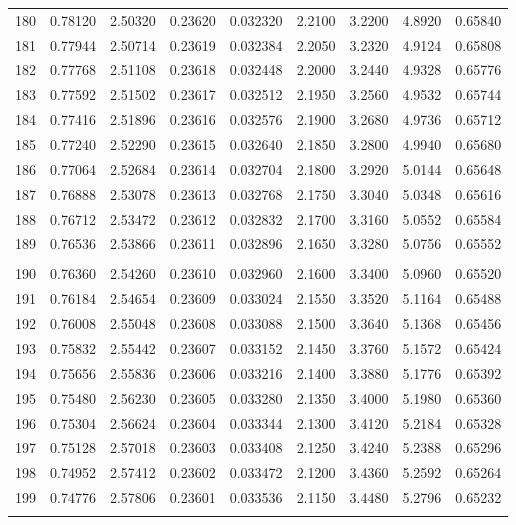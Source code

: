 \documentclass[letter,twosides,10pt]{article}
\begin{document}
\begin{longtable}{|c|c|c|c|c|c|c|c|c|}
180 & 0.78120 & 2.50320 & 0.23620 & 0.032320 & 2.2100 & 3.2200 & 4.8920 & 0.65840 \\
181 & 0.77944 & 2.50714 & 0.23619 & 0.032384 & 2.2050 & 3.2320 & 4.9124 & 0.65808 \\
182 & 0.77768 & 2.51108 & 0.23618 & 0.032448 & 2.2000 & 3.2440 & 4.9328 & 0.65776 \\
183 & 0.77592 & 2.51502 & 0.23617 & 0.032512 & 2.1950 & 3.2560 & 4.9532 & 0.65744 \\
184 & 0.77416 & 2.51896 & 0.23616 & 0.032576 & 2.1900 & 3.2680 & 4.9736 & 0.65712 \\
185 & 0.77240 & 2.52290 & 0.23615 & 0.032640 & 2.1850 & 3.2800 & 4.9940 & 0.65680 \\
186 & 0.77064 & 2.52684 & 0.23614 & 0.032704 & 2.1800 & 3.2920 & 5.0144 & 0.65648 \\
187 & 0.76888 & 2.53078 & 0.23613 & 0.032768 & 2.1750 & 3.3040 & 5.0348 & 0.65616 \\
188 & 0.76712 & 2.53472 & 0.23612 & 0.032832 & 2.1700 & 3.3160 & 5.0552 & 0.65584 \\
189 & 0.76536 & 2.53866 & 0.23611 & 0.032896 & 2.1650 & 3.3280 & 5.0756 & 0.65552 \\
 & & & & & & & & \\
190 & 0.76360 & 2.54260 & 0.23610 & 0.032960 & 2.1600 & 3.3400 & 5.0960 & 0.65520 \\
191 & 0.76184 & 2.54654 & 0.23609 & 0.033024 & 2.1550 & 3.3520 & 5.1164 & 0.65488 \\
192 & 0.76008 & 2.55048 & 0.23608 & 0.033088 & 2.1500 & 3.3640 & 5.1368 & 0.65456 \\
193 & 0.75832 & 2.55442 & 0.23607 & 0.033152 & 2.1450 & 3.3760 & 5.1572 & 0.65424 \\
194 & 0.75656 & 2.55836 & 0.23606 & 0.033216 & 2.1400 & 3.3880 & 5.1776 & 0.65392 \\
195 & 0.75480 & 2.56230 & 0.23605 & 0.033280 & 2.1350 & 3.4000 & 5.1980 & 0.65360 \\
196 & 0.75304 & 2.56624 & 0.23604 & 0.033344 & 2.1300 & 3.4120 & 5.2184 & 0.65328 \\
197 & 0.75128 & 2.57018 & 0.23603 & 0.033408 & 2.1250 & 3.4240 & 5.2388 & 0.65296 \\
198 & 0.74952 & 2.57412 & 0.23602 & 0.033472 & 2.1200 & 3.4360 & 5.2592 & 0.65264 \\
199 & 0.74776 & 2.57806 & 0.23601 & 0.033536 & 2.1150 & 3.4480 & 5.2796 & 0.65232 \\
 & & & & & & & & \\

\end{longtable}
\end{document}
